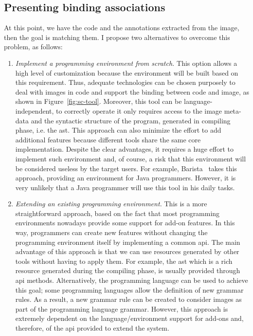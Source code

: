 \subsection{Presenting binding associations}

At this point, we have the code and the annotations extracted from the image, then the goal is matching them. I propose two alternatives to overcome this problem, as follows:

\begin{enumerate}
\item \textit{Implement a programming environment from scratch.} This option allows a high level of customization because the environment will be built based on this requirement. Thus, adequate technologies can be chosen purposely to deal with images in code and support the binding between code and image, as shown in Figure~\ref{fig:sc-tool}. Moreover, this tool can be language-independent, to correctly operate it only requires access to the image meta-data and the syntactic structure of the program, generated in compiling phase, i.e. the \gls{ast}. This approach can also minimize the effort to add additional features because different tools share the same core implementation. Despite the clear advantages, it requires a huge effort to implement such environment and, of course, a risk that this environment will be considered useless by the target users. For example, Barista~\citep{ko2006barista} takes this approach, providing an environment for Java programmers. However, it is very unlikely that a Java programmer will use this tool in his daily tasks.

\item \textit{Extending an existing programming environment.} This is a more straightforward approach, based on the fact that most programming environments nowadays provide some support for add-on features. In this way, programmers can create new features without changing the programming environment itself by implementing a common \gls{api}. The main advantage of this approach is that we can use resources generated by other tools without having to apply them. For example, the \gls{ast} which is a rich resource generated during the compiling phase, is usually provided through \gls{api} methods. Alternatively, the programming language can be used to achieve this goal; some programming languages allow the definition of new grammar rules. As a result, a new grammar rule can be created to consider images as part of the programming language grammar. However, this approach is extremely dependent on the language/environment support for add-ons and, therefore, of the \gls{api} provided to extend the system.
\end{enumerate}

